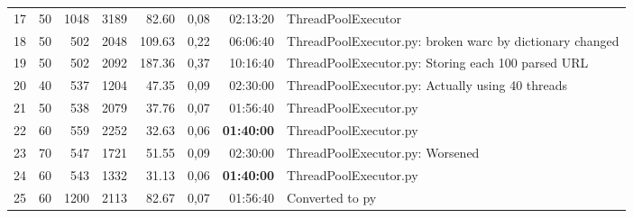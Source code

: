 \begin{table}[!ht]
\begin{tabular}{rrrrrrrl}
    17                    & 50                    & 1048                         & 3189                   & 82.60             & 0,08                               & 02:13:20                                       & ThreadPoolExecutor                                       \\
    18                    & 50                    & 502                          & 2048                   & 109.63            & 0,22                               & 06:06:40                                       & ThreadPoolExecutor.py: broken warc by dictionary changed \\
    19                    & 50                    & 502                          & 2092                   & 187.36            & 0,37                               & 10:16:40                                       & ThreadPoolExecutor.py: Storing each 100 parsed URL       \\
    20                    & 40                    & 537                          & 1204                   & 47.35             & 0,09                               & 02:30:00                                       & ThreadPoolExecutor.py: Actually using 40 threads         \\
    21                    & 50                    & 538                          & 2079                   & 37.76             & 0,07                               & 01:56:40                                       & ThreadPoolExecutor.py                                    \\
    22                    & 60                    & 559                          & 2252                   & 32.63             & 0,06                               & \textbf{01:40:00}                              & ThreadPoolExecutor.py                                    \\
    23                    & 70                    & 547                          & 1721                   & 51.55             & 0,09                               & 02:30:00                                       & ThreadPoolExecutor.py: Worsened                          \\
    24                    & 60                    & 543                          & 1332                   & 31.13             & 0,06                               & \textbf{01:40:00}                              & ThreadPoolExecutor.py                                    \\
    25                    & 60                    & 1200                         & 2113                   & 82.67             & 0,07                               & 01:56:40                                       & Converted to py                                          \\

\end{tabular}
\end{table}
